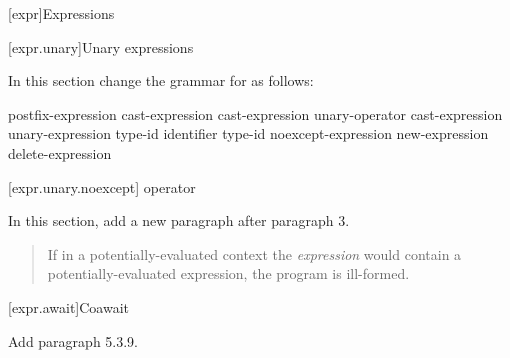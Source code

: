 

\setcounter{chapter}{4}
[expr]{Expressions}

\setcounter{section}{2}
[expr.unary]{Unary expressions}


In this section change the grammar for  as follows:

\begin{bnf}
	\br
	postfix-expression\br
	\terminal{++} cast-expression\br
	\terminal{-{-}} cast-expression\br
	\br
	unary-operator cast-expression\br
	 unary-expression\br
	 type-id \terminal{)}\br
	 \terminal{(} identifier \terminal{)}\br
	 type-id \terminal{)}\br
	noexcept-expression\br
	new-expression\br
	delete-expression\br
\end{bnf}

\setcounter{subsection}{6}
[expr.unary.noexcept]{ operator}


In this section, add a new paragraph after paragraph 3.

\begin{quote}
\setcounter{Paras}{3}
\pnum
If in a potentially-evaluated context the \textit{expression} would contain a potentially-evaluated  expression, the program is ill-formed.
\end{quote}

\setcounter{subsection}{8}
[expr.await]{Coawait}

Add paragraph 5.3.9.

